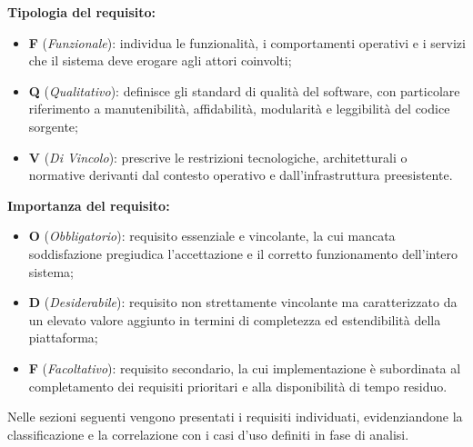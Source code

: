\noindent\textbf{Tipologia del requisito:}
\begin{itemize}
    \item \textbf{F} (\textit{Funzionale}): individua le funzionalità, i comportamenti operativi e i servizi che il sistema deve erogare agli attori coinvolti;
    \item \textbf{Q} (\textit{Qualitativo}): definisce gli standard di qualità del software, con particolare riferimento a manutenibilità, affidabilità, modularità e leggibilità del codice sorgente;
    \item \textbf{V} (\textit{Di Vincolo}): prescrive le restrizioni tecnologiche, architetturali o normative derivanti dal contesto operativo e dall'infrastruttura preesistente.
\end{itemize}

\noindent\textbf{Importanza del requisito:}
\begin{itemize}
    \item \textbf{O} (\textit{Obbligatorio}): requisito essenziale e vincolante, la cui mancata soddisfazione pregiudica l'accettazione e il corretto funzionamento dell'intero sistema;
    \item \textbf{D} (\textit{Desiderabile}): requisito non strettamente vincolante ma caratterizzato da un elevato valore aggiunto in termini di completezza ed estendibilità della piattaforma;
    \item \textbf{F} (\textit{Facoltativo}): requisito secondario, la cui implementazione è subordinata al completamento dei requisiti prioritari e alla disponibilità di tempo residuo.
\end{itemize}

\noindent Nelle sezioni seguenti vengono presentati i requisiti individuati, evidenziandone la classificazione e la correlazione con i casi d'uso definiti in fase di analisi.


